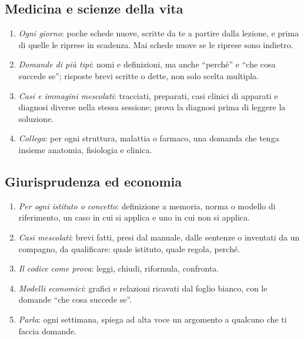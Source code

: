 \subsection*{Medicina e scienze della vita}

\begin{enumerate}[leftmargin=1.4em, itemsep=0pt, topsep=0.2\baselineskip]
  \item \emph{Ogni giorno}: poche schede nuove, scritte da te a partire
        dalla lezione, e prima di quelle le riprese in scadenza. Mai
        schede nuove se le riprese sono indietro.
  \item \emph{Domande di più tipi}: nomi e definizioni, ma anche
        \enquote{perché} e \enquote{che cosa succede se}; risposte
        brevi scritte o dette, non solo scelta multipla.
  \item \emph{Casi e immagini mescolati}: tracciati, preparati, casi
        clinici di apparati e diagnosi diverse nella stessa sessione;
        prova la diagnosi prima di leggere la soluzione.
  \item \emph{Collega}: per ogni struttura, malattia o farmaco, una
        domanda che tenga insieme anatomia, fisiologia e clinica.
\end{enumerate}

\subsection*{Giurisprudenza ed economia}

\begin{enumerate}[leftmargin=1.4em, itemsep=0pt, topsep=0.2\baselineskip]
  \item \emph{Per ogni istituto o concetto}: definizione a memoria,
        norma o modello di riferimento, un caso in cui si applica e uno
        in cui non si applica.
  \item \emph{Casi mescolati}: brevi fatti, presi dal manuale, dalle
        sentenze o inventati da un compagno, da qualificare: quale
        istituto, quale regola, perché.
  \item \emph{Il codice come prova}: leggi, chiudi, riformula, confronta.
  \item \emph{Modelli economici}: grafici e relazioni ricavati dal
        foglio bianco, con le domande \enquote{che cosa succede se}.
  \item \emph{Parla}: ogni settimana, spiega ad alta voce un argomento a
        qualcuno che ti faccia domande.
\end{enumerate}

